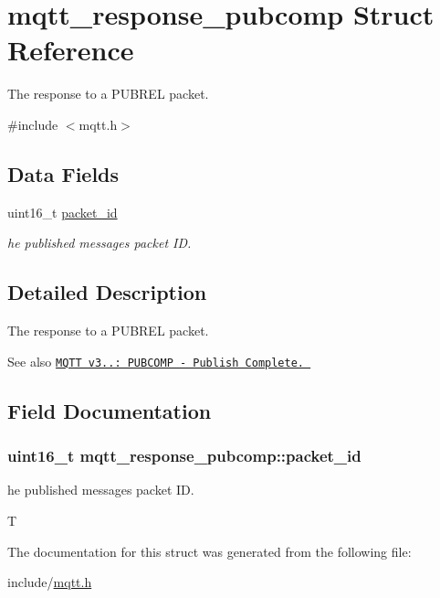 \hypertarget{structmqtt__response__pubcomp}{}\section{mqtt\+\_\+response\+\_\+pubcomp Struct Reference}
\label{structmqtt__response__pubcomp}


The response to a P\+U\+B\+R\+EL packet.  




{\ttfamily \#include $<$mqtt.\+h$>$}

\subsection*{Data Fields}
\begin{DoxyCompactItemize}
\item 
uint16\+\_\+t \hyperlink{structmqtt__response__pubcomp_a5b02ca112e556e81531f5354c294cb0c}{packet\+\_\+id}
\begin{DoxyCompactList}\small\item\em he published messages packet ID. \end{DoxyCompactList}\end{DoxyCompactItemize}


\subsection{Detailed Description}
The response to a P\+U\+B\+R\+EL packet. 

\begin{DoxySeeAlso}{See also}
\href{http://docs.oasis-open.org/mqtt/mqtt/v3.1.1/os/mqtt-v3.1.1-os.html#_Toc398718058}{\tt M\+Q\+TT v3..\+: P\+U\+B\+C\+O\+MP -\/ Publish Complete. } 
\end{DoxySeeAlso}


\subsection{Field Documentation}
\subsubsection[{\texorpdfstring{packet\+\_\+id}{packet_id}}]{\setlength{\rightskip}{0pt plus 5cm}uint16\+\_\+t mqtt\+\_\+response\+\_\+pubcomp\+::packet\+\_\+id}\hypertarget{structmqtt__response__pubcomp_a5b02ca112e556e81531f5354c294cb0c}{}\label{structmqtt__response__pubcomp_a5b02ca112e556e81531f5354c294cb0c}


he published messages packet ID. 

T 

The documentation for this struct was generated from the following file\+:\begin{DoxyCompactItemize}
\item 
include/\hyperlink{mqtt_8h}{mqtt.\+h}\end{DoxyCompactItemize}
